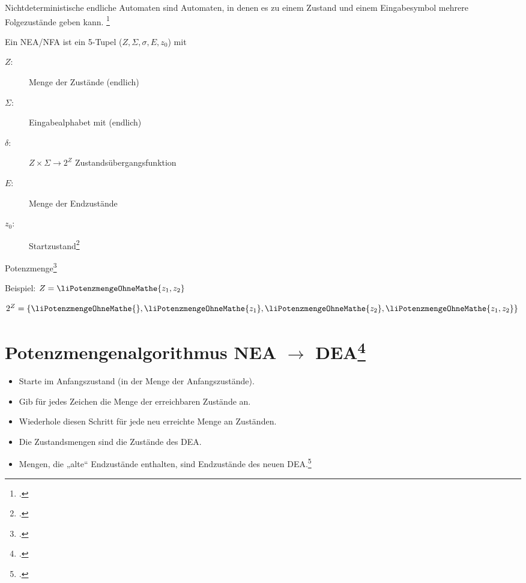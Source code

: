 \documentclass{lehramt-informatik-haupt}
\begin{document}
\begin{center}
\end{center}

Nichtdeterministische endliche Automaten sind Automaten, in denen es zu
einem Zustand und einem Eingabesymbol mehrere Folgezustände geben kann.
\footcite[Seite 28]{vossen}

Ein NEA/NFA ist ein 5-Tupel ($Z, \Sigma, \sigma, E, z_0$) mit

\begin{description}
\item[$Z$:] Menge der Zustände (endlich)
\item[$\Sigma$:] Eingabealphabet mit (endlich)
\item[$\delta$:] $Z \times \Sigma \rightarrow 2^Z$ Zustandsübergangsfunktion
\item[$E$:] Menge der Endzustände
\item[$z_0$:] Startzustand\footcite[Seite 30]{theo:fs:1}
\end{description}

Potenzmenge\footcite{wiki:potenzmenge}

\let\p=\liPotenzmengeOhneMathe

Beispiel: $Z = \p{ z_1, z_2 }$

$2^Z = \{\p{}, \p{z_1 }, \p{z_2 }, \p{z_1 , z_2 }\}$

%

\section{Potenzmengenalgorithmus NEA $\rightarrow$ DEA\footcite[Seite 35-48]{theo:fs:1}}

\begin{itemize}
\item Starte im Anfangszustand (in der Menge der Anfangszustände).

\item Gib für jedes Zeichen die Menge der erreichbaren Zustände an.

\item Wiederhole diesen Schritt für jede neu erreichte Menge an
Zuständen.

\item Die Zustandsmengen sind die Zustände des DEA.

\item Mengen, die „alte“ Endzustände enthalten, sind Endzustände des
neuen DEA.\footcite{wiki:potenzmengenkonstruktion}
\end{itemize}
\literatur
\end{document}
